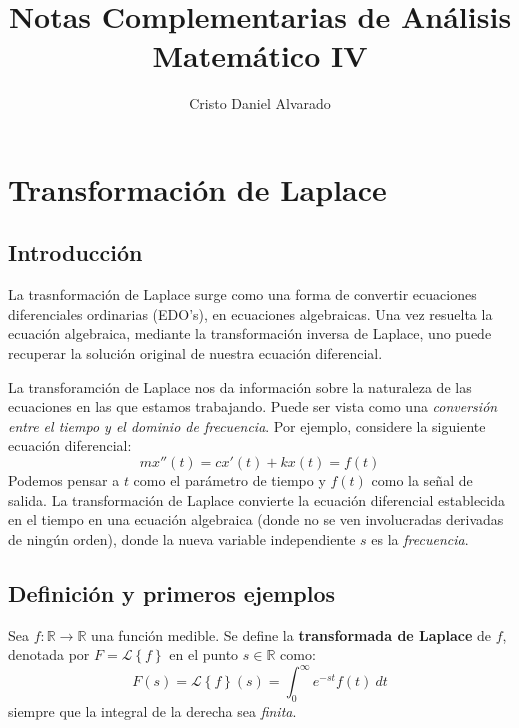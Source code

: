 \documentclass[12pt]{report}
\theoremstyle{largebreak}
\newcommand\cf[3]{\ensuremath{#1:#2\rightarrow#3}}
\begin{document}
    \setlength{\parskip}{5pt} %
    \setlength{\parindent}{12pt} %
    \title{Notas Complementarias de Análisis Matemático IV}
    \author{Cristo Daniel Alvarado}
    \maketitle

    \tableofcontents %

    \setcounter{chapter}{4} %

    \chapter{Transformación de Laplace}

    \section{Introducción}

    La trasnformación de Laplace surge como una forma de convertir ecuaciones diferenciales ordinarias (EDO's), en ecuaciones algebraicas. Una vez resuelta la ecuación algebraica, mediante la transformación inversa de Laplace, uno puede recuperar la solución original de nuestra ecuación diferencial.

    La transforamción de Laplace nos da información sobre la naturaleza de las ecuaciones en las que estamos trabajando. Puede ser vista como una \textit{conversión entre el tiempo y el dominio de frecuencia}. Por ejemplo, considere la siguiente ecuación diferencial:
    \begin{equation*}
        mx''(t)=cx'(t)+kx(t)=f(t)
    \end{equation*}
    Podemos pensar a $t$ como el parámetro de tiempo y $f(t)$ como la señal de salida. La transformación de Laplace convierte la ecuación diferencial establecida en el tiempo en una ecuación algebraica (donde no se ven involucradas derivadas de ningún orden), donde la nueva variable independiente $s$ es la \textit{frecuencia}.

    \section{Definición y primeros ejemplos}

    \begin{mydef}
        Sea $\cf{f}{\mathbb{R}}{\mathbb{R}}$ una función medible.
        Se define la \textbf{transformada de Laplace} de $f$, denotada por $F=\mathcal{L}\left\{f\right\}$ en el punto $s\in\mathbb{R}$ como:
        \begin{equation*}
            F(s)=\mathcal{L}\left\{f\right\}(s)=\int_0^{\infty}e^{-st}f(t)\:dt
        \end{equation*}
        siempre que la integral de la derecha sea \textit{finita}.
    \end{mydef}
\end{document}
